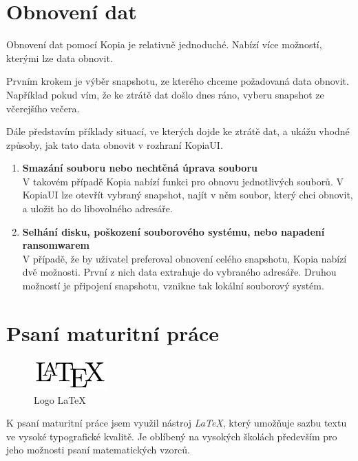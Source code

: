 \documentclass[a4paper,12pt, oneside]{book}
\begin{document}
\newpage

\section{Obnovení dat}

Obnovení dat pomocí Kopia je relativně jednoduché. Nabízí více možností,
kterými lze data obnovit. 

Prvním krokem je výběr snapshotu, ze kterého chceme požadovaná data obnovit.
Například pokud vím, že ke ztrátě dat došlo dnes ráno, vyberu snapshot ze 
včerejšího večera.

Dále představím příklady situací, ve kterých dojde
ke ztrátě dat, a ukážu vhodné způsoby, jak tato data obnovit v rozhraní
KopiaUI.

\begin{enumerate}
	\item \textbf{Smazání souboru nebo nechtěná úprava souboru} \\
		V takovém případě Kopia nabízí funkci pro obnovu jednotlivých 
		souborů. V KopiaUI lze otevřít vybraný snapshot,
		najít v něm soubor, který chci obnovit, a uložit ho
		do libovolného adresáře.
	\item \textbf{Selhání disku, poškození souborového systému, nebo napadení
		ransomwarem} \\
		V případě, že by uživatel preferoval obnovení celého snapshotu,
		Kopia nabízí dvě možnosti. První z nich data extrahuje do vybraného
		adresáře. Druhou možností je připojení snapshotu, vznikne tak lokální
		souborový systém.
\end{enumerate}


\section{Psaní maturitní práce}

\begin{figure}
	\centering
	\includegraphics[width=0.25\textwidth]{img/LaTeX_logo.png}
	\caption{Logo LaTeX}
\end{figure}

K psaní maturitní práce jsem využil nástroj \emph{LaTeX}, který
umožňuje sazbu textu ve vysoké typografické kvalitě. \cite{Latex-Wikipedia}  Je
oblíbený na vysokých školách především pro jeho možnosti psaní matematických
vzorců. 
\end{document}
